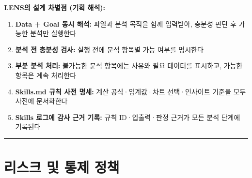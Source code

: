 \documentclass[10pt,a4paper]{article}
\providecommand{\tightlist}{\setlength{\itemsep}{0pt}\setlength{\parskip}{0pt}}
\begin{document}
\textbf{LENS의 설계 차별점 (기획 해석):}

\begin{enumerate}
\def\labelenumi{\arabic{enumi}.}
\tightlist
\item
  \textbf{Data + Goal 동시 해석:} 파일과 분석 목적을 함께 입력받아, 충분성 판단 후 가능한 분석만 실행한다
\item
  \textbf{분석 전 충분성 검사:} 실행 전에 분석 항목별 가능 여부를 명시한다
\item
  \textbf{부분 분석 처리:} 불가능한 분석 항목에는 사유와 필요 데이터를 표시하고, 가능한 항목은 계속 처리한다
\item
  \textbf{Skills.md 규칙 사전 명세:} 계산 공식·임계값·차트 선택·인사이트 기준을 모두 사전에 문서화한다
\item
  \textbf{Skills 로그에 감사 근거 기록:} 규칙 ID·입출력·판정 근거가 모든 분석 단계에 기록된다
\end{enumerate}

\begin{center}\rule{0.5\linewidth}{0.5pt}\end{center}

\section{리스크 및 통제 정책}\label{uxb9acuxc2a4uxd06c-uxbc0f-uxd1b5uxc81c-uxc815uxcc45}
\end{document}
